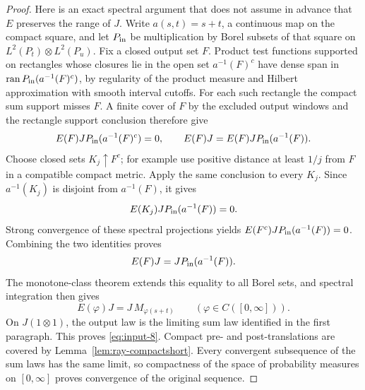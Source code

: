 \begin{proof}
Here is an exact spectral argument that does not assume in advance
that \(E\) preserves the range of \(J\).  Write
\(a(s,t)=s+t\), a continuous map on the compact square, and let
\(P_{\rm in}\) be multiplication by Borel subsets of that square
on \(L^2(P_t)\otimes L^2(P_u)\).  Fix a closed output set \(F\).
Product test functions supported on rectangles whose closures lie
in the open set \(a^{-1}(F)^c\) have dense span in
\(\operatorname{ran} P_{\rm in}(a^{-1}(F)^c)\), by regularity of the product
measure and Hilbert approximation with smooth interval cutoffs.
For each such rectangle the compact sum support misses \(F\).
A finite cover of \(F\) by the excluded output windows and the
rectangle support conclusion therefore give
\[
 E(F)J P_{\rm in}(a^{-1}(F)^c)=0,
 \qquad
 E(F)J=E(F)J P_{\rm in}(a^{-1}(F)).
\]
Choose closed sets \(K_j\uparrow F^c\); for example use positive
distance at least \(1/j\) from \(F\) in a compatible compact
metric.  Apply the same conclusion to every \(K_j\).
Since \(a^{-1}(K_j)\) is disjoint from \(a^{-1}(F)\), it gives
\[
 E(K_j)J P_{\rm in}(a^{-1}(F))=0.
\]
Strong convergence of these spectral projections yields
\(E(F^c)J P_{\rm in}(a^{-1}(F))=0\).  Combining the two identities
proves
\[
                    E(F)J=J P_{\rm in}(a^{-1}(F)).
\]
The monotone-class theorem extends this equality to all Borel
sets, and spectral integration then gives
\[
 E(\varphi)J=J\,M_{\varphi(s+t)}
 \qquad(\varphi\in C([0,\infty])).
\]
On \(J(1\otimes1)\), the output law is the limiting sum law
identified in the first paragraph.  This proves
\eqref{eq:input-8}.  Compact pre- and post-translations
are covered by Lemma~\ref{lem:ray-compactshort}.  Every convergent
subsequence of the sum laws has the same limit, so compactness of
the space of probability measures on \([0,\infty]\) proves
convergence of the original sequence.
\end{proof}
